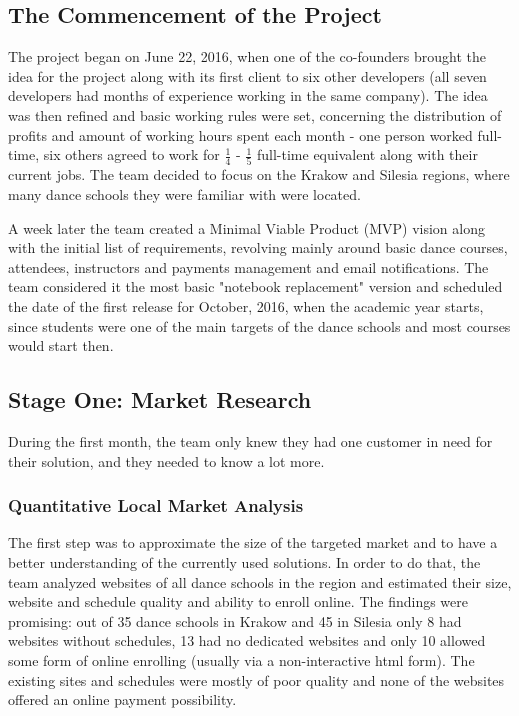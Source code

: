 \documentclass{article}
\begin{document}
\subsection{The Commencement of the Project}
The project began on June 22, 2016, when one of the co-founders brought the idea for the project along with its first client to six other developers (all seven developers had months of experience working in the same company). The idea was then refined and basic working rules were set, concerning the distribution of profits and amount of working hours spent each month - one person worked full-time, six others agreed to work for \( \frac{1}{4} \) - \( \frac{1}{5} \) full-time equivalent along with their current jobs. The team decided to focus on the Krakow and Silesia regions, where many dance schools they were familiar with were located.

A week later the team created a Minimal Viable Product (MVP) vision along with the initial list of requirements, revolving mainly around basic dance courses, attendees, instructors and payments management and email notifications. The team considered it the most basic "notebook replacement" version and scheduled the date of the first release for October, 2016, when the academic year starts, since students were one of the main targets of the dance schools and most courses would start then.

\subsection{Stage One: Market Research}
During the first month, the team only knew they had one customer in need for their solution, and they needed to know a lot more.

\subsubsection{Quantitative Local Market Analysis}
The first step was to approximate the size of the targeted market and to have a better understanding of the currently used solutions. In order to do that, the team analyzed websites of all dance schools in the region and estimated their size, website and schedule quality and ability to enroll online. The findings were promising: out of 35 dance schools in Krakow and 45 in Silesia only 8 had websites without schedules, 13 had no dedicated websites and only 10 allowed some form of online enrolling (usually via a non-interactive html form). The existing sites and schedules were mostly of poor quality and none of the websites offered an online payment possibility.
\end{document}
